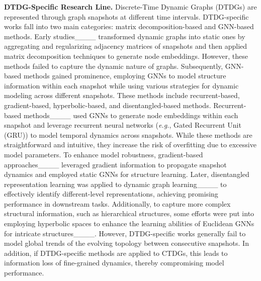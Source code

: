 \noindent\textbf{DTDG-Specific Research Line.} Discrete-Time Dynamic Graphs (DTDGs) are represented through graph snapshots at different time intervals. DTDG-specific works fall into two main categories: matrix decomposition-based and GNN-based methods. Early studies____ transformed dynamic graphs into static ones by aggregating and regularizing adjacency matrices of snapshots and then applied matrix decomposition techniques to generate node embeddings. However, these methods failed to capture the dynamic nature of graphs. Subsequently, GNN-based methods gained prominence, employing GNNs to model structure information within each snapshot while using various strategies for dynamic modeling across different snapshots. These methods include recurrent-based, gradient-based, hyperbolic-based, and disentangled-based methods. Recurrent-based methods____ used GNNs to generate node embeddings within each snapshot and leverage recurrent neural networks (\textit{e.g.}, Gated Recurrent Unit (GRU)) to model temporal dynamics across snapshots. While these methods are straightforward and intuitive, they increase the risk of overfitting due to excessive model parameters.
To enhance model robustness, gradient-based approaches____ leveraged gradient information to propagate snapshot dynamics and employed static GNNs for structure learning. Later, disentangled representation learning was applied to dynamic graph learning____ to effectively identify different-level representations, achieving promising performance in downstream tasks. Additionally, to capture more complex structural information, such as hierarchical structures, some efforts were put into employing hyperbolic spaces to enhance the learning abilities of Euclidean GNNs for intricate structures____. However, DTDG-specific works generally fail to model global trends of the evolving topology between consecutive snapshots. In addition, if DTDG-specific methods are applied to CTDGs, this leads to information loss of fine-grained dynamics, thereby compromising model performance.







